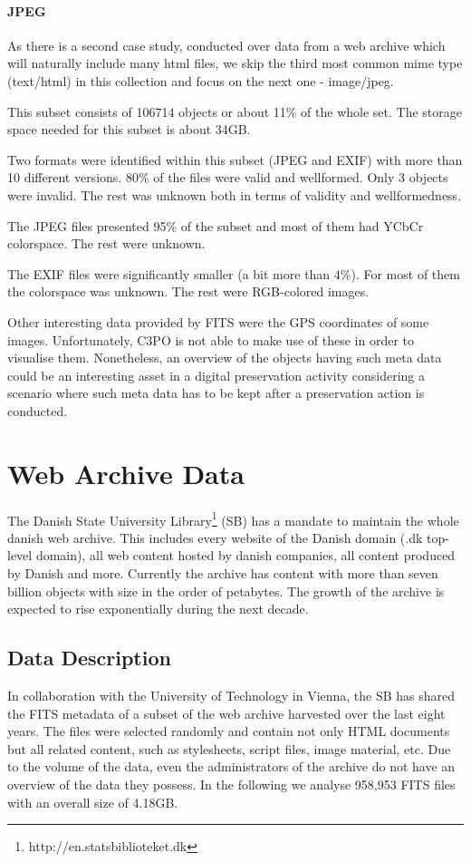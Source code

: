 \paragraph{JPEG}
As there is a second case study, conducted over data from a web archive which will naturally include many html files, we skip the third most common mime type (text/html) in this collection and focus on the next one -  image/jpeg.

This subset consists of 106714 objects or about 11\% of the whole set.
The storage space needed for this subset is about 34GB.

Two formats were identified within this subset (JPEG and EXIF) with more than 10 different versions.
80\% of the files were valid and wellformed. Only 3 objects were invalid.
The rest was unknown both in terms of validity and wellformedness.

The JPEG files presented 95\% of the subset and most of them had YCbCr colorspace.
The rest were unknown.

The EXIF files were significantly smaller (a bit more than 4\%).
For most of them the colorspace was unknown.
The rest were RGB-colored images.

Other interesting data provided by FITS were the GPS coordinates of some images.
Unfortunately, C3PO is not able to make use of these in order to visualise them.
Nonetheless, an overview of the objects having such meta data could be an interesting asset in a digital preservation activity considering a scenario where such meta data has to be kept after a preservation action is conducted. 

\section{Web Archive Data}
The Danish State University Library\footnote{http://en.statsbiblioteket.dk} (SB) has a mandate to maintain the whole danish web archive.
This includes every website of the Danish domain (.dk top-level domain), all web content hosted by danish companies, all content produced by Danish and more.
Currently the archive has content with more than seven billion objects with size in the order of petabytes. The growth of the archive is expected to rise exponentially during the next decade.

\subsection{Data Description}
In collaboration with the University of Technology in Vienna, the SB has shared the FITS metadata of a subset of the web archive harvested over the last eight years.
The files were selected randomly and contain not only HTML documents but all related content, such as stylesheets, script files, image material, etc.
Due to the volume of the data, even the administrators of the archive do not have an overview of the data they possess.
In the following we analyse 958,953 FITS files with an overall size of 4.18GB.

